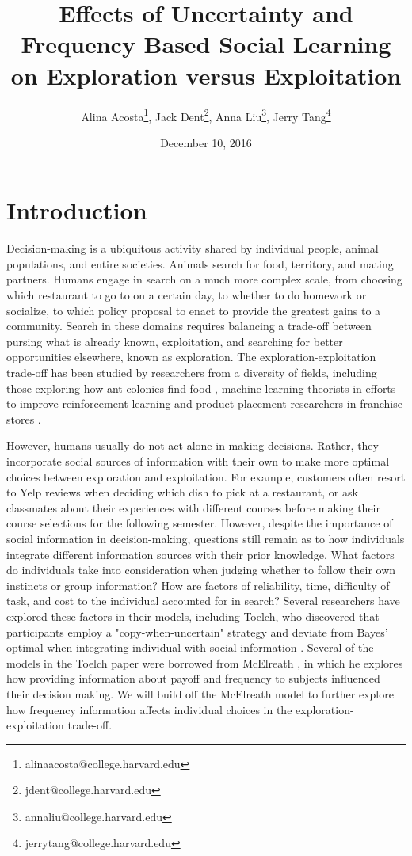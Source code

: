 \documentclass[11pt, a4paper]{article}
\title{Effects of Uncertainty and Frequency Based Social Learning on Exploration versus Exploitation}
\author{Alina Acosta\footnote{alinaacosta@college.harvard.edu}, Jack Dent\footnote{jdent@college.harvard.edu}, Anna Liu\footnote{annaliu@college.harvard.edu}, Jerry Tang\footnote{jerrytang@college.harvard.edu}}
\date{December 10, 2016}
\begin{document}
\maketitle

\section{Introduction}

Decision-making is a ubiquitous activity shared by individual people, animal populations, and entire societies. Animals search for food, territory, and mating partners. Humans engage in search on a much more complex scale, from choosing which restaurant to go to on a certain day, to whether to do homework or socialize, to which policy proposal to enact to provide the greatest gains to a community. Search in these domains requires balancing a trade-off between pursing what is already known, exploitation, and searching for better opportunities elsewhere, known as exploration. The exploration-exploitation trade-off has been studied by researchers from a diversity of fields, including those exploring how ant colonies find food \cite{Deneubourg1986}, machine-learning theorists in efforts to improve reinforcement learning \cite{Kaelbling} and product placement researchers in franchise stores \cite{Sorenson}.

However, humans usually do not act alone in making decisions. Rather, they incorporate social sources of information with their own to make more optimal choices between exploration and exploitation. For example, customers often resort to Yelp reviews when deciding which dish to pick at a restaurant, or ask classmates about their experiences with different courses before making their course selections for the following semester. However, despite the importance of social information in decision-making, questions still remain as to how individuals integrate different information sources with their prior knowledge. What factors do individuals take into consideration when judging whether to follow their own instincts or group information? How are factors of reliability, time, difficulty of task, and cost to the individual accounted for in search? Several researchers have explored these factors in their models, including Toelch, who discovered that participants employ a "copy-when-uncertain" strategy and deviate from Bayes' optimal when integrating individual with social information \cite{Toelch2013a}. Several of the models in the Toelch paper were borrowed from McElreath \cite{McElreathetalSuccessbias2008}, in which he explores how providing information about payoff and frequency to subjects influenced their decision making. We will build off the McElreath model to further explore how frequency information affects individual choices in the exploration-exploitation trade-off.
\end{document}
